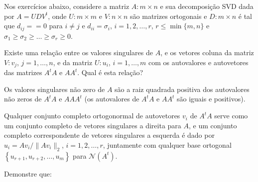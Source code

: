 \documentclass[a4paper,12pt, leqno, answers]{exam}
\begin{document}
\thispagestyle{empty}

\newpage
\setcounter{page}{1}
Nos exerc\'{i}cios abaixo, considere a matriz $A : m \times n$ e sua decomposi\c{c}\~{a}o SVD dada por $A = U D V^t$, onde $U : m \times m$ e $V : n \times n$ s\~{a}o matrizes ortogonais e $D : m \times n$ \'{e} tal que $d_{ij} = =0$ para $i \neq j$ e $d_{ii} = \sigma_i$, $i = 1, 2, \ldots, r$, $r \leq \min\{m, n\}$ e $ \sigma_1 \geq \sigma_2 \geq \ldots \geq \sigma_r \geq 0$.
\begin{questions}
    \question Existe uma rela\c{c}\~{a}o entre os valores singulares de $A$, e os vetores coluna da matriz $V : v_j$, $j = 1, \ldots, n$, e da matriz $U : u_i$, $i = 1, \ldots, m$ com os autovalores e autovetores das matrizes $A^t A$ e $A A^t$. Qual \'{e} esta rela\c{c}\~{a}o?
    \begin{solution}
        Os valores singulares n\~{a}o zero de $A$ s\~{a}o a raiz quadrada positiva dos autovalores n\~{a}o zeros de $A^t A$ e $A A A^t$ (os autovalores de $A^t A$ e $A A^t$ s\~{a}o iguais e positivos).

        Qualquer conjunto completo ortogonormal de autovetores $v_i$ de $A^t A$ serve como um conjunto completo de vetores singulares a direita para $A$, e um conjunto completo correspondente de vetores singulares a esquerda \'{e} dado por $u_i = A v_i / \| A v_i \|_2$, $i = 1, 2, \ldots, r$, juntamente com qualquer base ortogonal $\left\{ u_{r + 1}, u_{r + 2}, \ldots, u_{m} \right\}$ para $\mathcal{N}(A^t)$.
    \end{solution}

    \question Demonstre que:
\end{questions}
\end{document}

